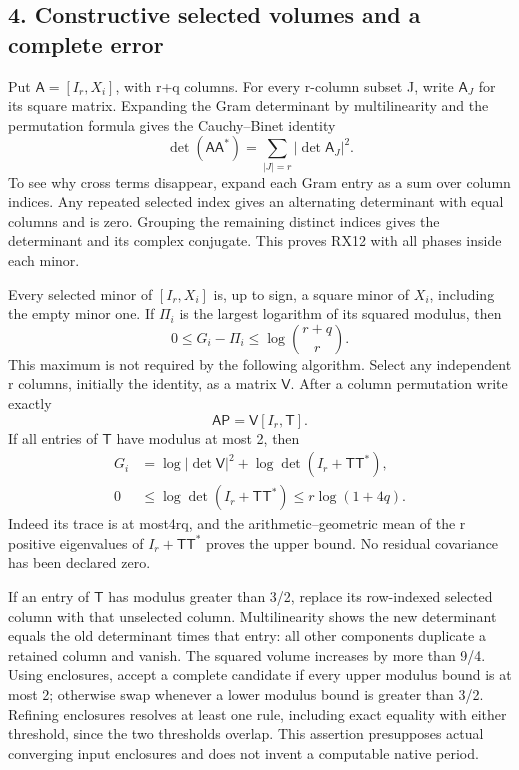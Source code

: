 \documentclass[11pt]{article}
\begin{document}
\subsection{4. Constructive selected volumes and a complete error}\label{constructive-selected-volumes-and-a-complete-error}

Put \(\mathsf A=[I_r,X_i]\), with r+q columns. For every r-column subset J, write \(\mathsf A_J\) for its square matrix. Expanding the Gram determinant by multilinearity and the permutation formula gives the Cauchy--Binet identity \[
\det(\mathsf A\mathsf A^*)=\sum_{|J|=r}|\det\mathsf A_J|^2.
\tag{RX12}
\] To see why cross terms disappear, expand each Gram entry as a sum over column indices. Any repeated selected index gives an alternating determinant with equal columns and is zero. Grouping the remaining distinct indices gives the determinant and its complex conjugate. This proves RX12 with all phases inside each minor.

Every selected minor of \([I_r,X_i]\) is, up to sign, a square minor of \(X_i\), including the empty minor one. If \(\Pi_i\) is the largest logarithm of its squared modulus, then \[
0\le G_i-\Pi_i\le\log\binom{r+q}{r}.
\tag{RX13}
\] This maximum is not required by the following algorithm. Select any independent r columns, initially the identity, as a matrix \(\mathsf V\). After a column permutation write exactly \[
\mathsf A\mathsf P=\mathsf V[I_r,\mathsf T].
\tag{RX14}
\] If all entries of \(\mathsf T\) have modulus at most 2, then \[
\begin{aligned}
G_i&=\log|\det\mathsf V|^2+\log\det(I_r+\mathsf T\mathsf T^*),\\
0&\le\log\det(I_r+\mathsf T\mathsf T^*)\le r\log(1+4q).
\end{aligned}
\tag{RX15}
\] Indeed its trace is at most4rq, and the arithmetic--geometric mean of the r positive eigenvalues of \(I_r+\mathsf T\mathsf T^*\) proves the upper bound. No residual covariance has been declared zero.

If an entry of \(\mathsf T\) has modulus greater than 3/2, replace its row-indexed selected column with that unselected column. Multilinearity shows the new determinant equals the old determinant times that entry: all other components duplicate a retained column and vanish. The squared volume increases by more than 9/4. Using enclosures, accept a complete candidate if every upper modulus bound is at most 2; otherwise swap whenever a lower modulus bound is greater than 3/2. Refining enclosures resolves at least one rule, including exact equality with either threshold, since the two thresholds overlap. This assertion presupposes actual converging input enclosures and does not invent a computable native period.
\end{document}
